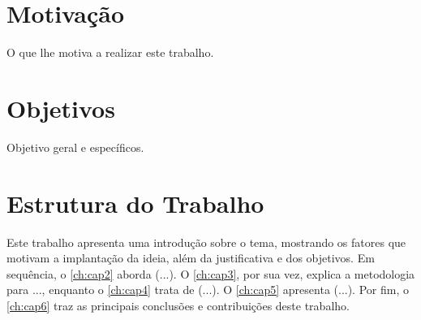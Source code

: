 \section{Motivação}
O que lhe motiva a realizar este trabalho.

\section{Objetivos}
Objetivo geral e específicos.

\section{Estrutura do Trabalho}
Este trabalho apresenta uma introdução sobre o tema, mostrando os fatores que motivam a implantação da ideia, além da justificativa e dos objetivos. Em sequência, o \autoref{ch:cap2} aborda (...). O \autoref{ch:cap3}, por sua vez, explica a metodologia para ..., enquanto o \autoref{ch:cap4} trata de (...). O \autoref{ch:cap5} apresenta (...). Por fim, o \autoref{ch:cap6} traz as principais conclusões e contribuições deste trabalho.